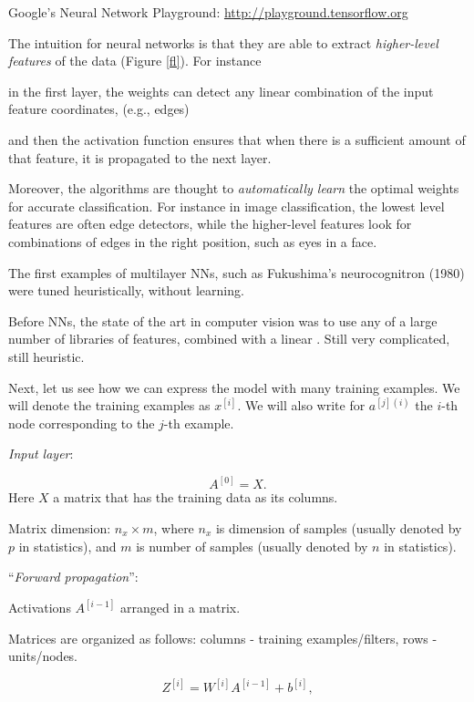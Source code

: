 \documentclass[english]{article}
\begin{document}
Google's Neural Network Playground: \url{http://playground.tensorflow.org}


\item 
The intuition for neural networks is that they are able to extract \emph{higher-level features} of the data (Figure \ref{fl}). For instance 

\benum 
\item in the first layer, the weights can detect any linear combination of the input feature coordinates, (e.g., edges)
\item and then the activation function ensures that when there is a sufficient amount of that feature, it is propagated to the next layer. 
\eenum 


Moreover, the algorithms are thought to \emph{automatically learn} the optimal weights for accurate classification.  For instance in image classification, the lowest level features are often edge detectors, while the higher-level features look for combinations of edges in the right position, such as eyes in a face. 

The first examples of multilayer NNs, such as Fukushima's neurocognitron (1980) were tuned heuristically, without learning.

Before NNs, the state of the art in computer vision was to use any of a large number of libraries of features, combined with a linear  . Still very complicated, still heuristic.

\item Next, let us see how we can express the model with many training  examples. We will denote the training examples as $x^{[i]}$. We will also write for $a^{[j](i)}$ the $i$-th node corresponding to the $j$-th example. 

\benum 
\item 
\emph{Input layer}:  

$$A^{[0]} = X.$$ 
Here $X$ a matrix that has the training data as its columns. 

Matrix dimension: $n_x \times m$, where $n_x$ is dimension of samples (usually denoted by $p$ in statistics), and $m$ is number of samples (usually denoted by $n$ in statistics).
\item 
``\emph{Forward propagation}'': 

Activations $A^{[i-1]}$ arranged in a matrix. 

Matrices are organized as follows: columns - training examples/filters,  rows - units/nodes. 


$$Z^{[i]} =  W^{[i]}A^{[i-1]}+b^{[i]},$$
\end{document}
